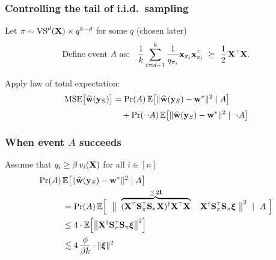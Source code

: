 \documentclass{beamer}
\begin{document}
\begin{frame}
  \frametitle{Controlling the tail of i.i.d.~sampling}
  Let $\pi\sim{\mathrm{VS}}^d(\mathbf X)\times q^{k-d}$ for some $q$ (chosen later)
  \pause
  \begin{align*}
      \text{Define event $A$ as:}\quad
\frac1k\sum_{i=d+1}^k\frac1{q_{\pi_i}}\x_{\pi_i}\x_{\pi_i}^\top\
      \succeq\ \frac12\,\X^\top\X.  
  \end{align*}
  \pause\vspace{5mm}
  
    Apply law of total expectation:
    \begin{align*}
      {\mathrm{MSE}\big[\widehat{\mathbf w}(\mathbf y_S)\big]}
      &= \mathrm{Pr}(A)\,\mathbb E\big[\|\widehat{\mathbf w}(\mathbf y_S)-\mathbf w^*\|^2\mid
        A\big]
\\[1mm] &\quad+\mathrm{Pr}(\neg A)\,\mathbb E\big[\|\widehat{\mathbf w}(\mathbf y_S)-\mathbf w^*\|^2\mid \neg A\big]
    \end{align*}
\end{frame}

\begin{frame}
  \frametitle{When event $A$ succeeds}
  Assume that $q_i\geq \beta \,v_i(\mathbf X)$ for all $i\in[n]$
  \pause
\begin{align*}
\Pr(A)\,&\E\big[\|\wbh(\y_S)-\w^*\|^2\mid A\big]
\\ &=\Pr(A)\,\E\Big[\ \
     \big\|\
     \overbrace{(\X^\top\S_\pi^\top\S_\pi\X)^{\dagger}\X^\top\X}^{\preceq\,
     2\I}\quad
   \X^\dagger\S_\pi^\top\S_\pi\xib
\ \big\|^2\ \mid \ A\ \Big]
\\ &  \leq
     4\cdot\E\Big[\big\|\X^\dagger\S_\pi^\top\S_\pi\xib\big\|^2\Big]
\\ & \lesssim 4\,\frac\phi{\beta k}\cdot\|\xib\|^2
\end{align*}
\end{frame}
\end{document}

